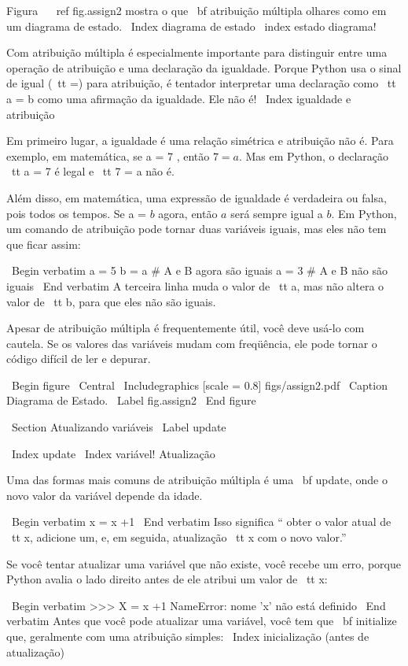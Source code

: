 \documentclass[10pt]{book}
\begin{document}
{{{{Figura ~ \ ref {} fig.assign2 mostra o que {\ bf atribuição múltipla} olhares
como em um diagrama de estado. \ Index {diagrama de estado} \ index {estado diagrama!}

Com atribuição múltipla é especialmente importante para distinguir
entre uma operação de atribuição e uma declaração da igualdade. Porque
Python usa o sinal de igual ({\ tt =}) para atribuição, é tentador
interpretar uma declaração como {\ tt a = b} como uma afirmação da igualdade. Ele
não é!
\ Index {igualdade e atribuição}

Em primeiro lugar, a igualdade é uma relação simétrica e atribuição não é. Para
exemplo, em matemática, se a = 7 $ $, então $ 7 = a $. Mas em Python, o
declaração {\ tt a = 7} é legal e {\ tt 7 = a} não é.

Além disso, em matemática, uma expressão de igualdade é verdadeira ou
falsa, pois todos os tempos. Se a = $ b $ agora, então $ a $ será sempre igual a $ b $.
Em Python, um comando de atribuição pode tornar duas variáveis ​​iguais, mas
eles não tem que ficar assim:

\ Begin {verbatim}
a = 5
b = a # A e B agora são iguais
a = 3 # A e B não são iguais
\ End {verbatim}
%
A terceira linha muda o valor de {\ tt a}, mas não altera o
valor de {\ tt b}, para que eles não são iguais. 

Apesar de atribuição múltipla é frequentemente útil, você deve usá-lo
com cautela. Se os valores das variáveis ​​mudam com freqüência, ele pode
tornar o código difícil de ler e depurar.

\ Begin {figure}
\ Central
{\ Includegraphics [scale = 0.8] {figs/assign2.pdf}}
\ Caption {Diagrama de Estado.}
\ Label {} fig.assign2
\ End {figure}



\ Section {Atualizando variáveis}
\ Label {update}

\ Index {update}
\ Index {variável! Atualização}

Uma das formas mais comuns de atribuição múltipla é uma {\ bf update},
onde o novo valor da variável depende da idade.

\ Begin {verbatim}
x = x +1
\ End {verbatim}
%
Isso significa `` obter o valor atual de {\ tt x}, adicione um, e, em seguida,
atualização {\ tt x} com o novo valor.''

Se você tentar atualizar uma variável que não existe, você recebe um
erro, porque Python avalia o lado direito antes de ele atribui
um valor de {\ tt x}:

\ Begin {verbatim}
>>> X = x +1
NameError: nome 'x' não está definido
\ End {verbatim}
%
Antes que você pode atualizar uma variável, você tem que {\ bf initialize}
que, geralmente com uma atribuição simples:
\ Index {inicialização (antes de atualização)}

}}}}
\end{document}
